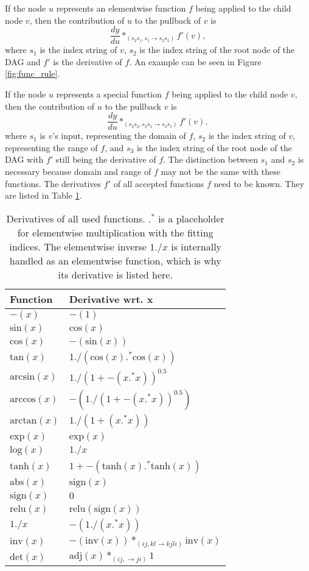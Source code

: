 \documentclass[12pt, a4paper]{report} %
\begin{document}
If the node $u$ represents an elementwise function $f$ being applied to the child node $v$, then the contribution of $u$ to the pullback of $v$ is 
$$
\frac{dy}{du} *_{(s_2s_1,s_1 \rightarrow s_2s_1)} f'(v),
$$
where $s_1$ is the index string of $v$, $s_2$ is the index string of the root node of the DAG and $f'$ is the derivative of $f$.
An example can be seen in Figure \ref{fig:func_rule}.

If the node $u$ represents a special function $f$ being applied to the child node $v$, then the contribution of $u$ to the pullback $v$ is
$$
\frac{dy}{du} *_{(s_3s_2,s_2s_1 \rightarrow s_3s_1)} f'(v),
$$
where $s_1$ is $v$'s input, representing the domain of $f$, $s_2$ is the index string of $v$, representing the range of $f$, and $s_3$ is the index string of the root node of the DAG with $f'$ still being the derivative of $f$.
The distinction between $s_1$ and $s_2$ is necessary because domain and range of $f$ may not be the same with these functions.
The derivatives $f'$ of all accepted functions $f$ need to be known.
They are listed in Table \ref{tab:func_diffs}.

\begin{table}[ht]
    \centering
    \begin{tabular}{l | l}
        Function & Derivative wrt. x \\\hline
        $-(x)$ & $-(1)$ \\
        $\text{sin}(x)$ & $\text{cos}(x)$ \\
        $\text{cos}(x)$ & $-(\text{sin}(x))$ \\
        $\text{tan}(x)$ & $1 ./ (\text{cos}(x) .^* \text{cos}(x))$ \\
        $\text{arcsin}(x)$ & $1 ./ (1 + -(x .^* x))^{0.5}$ \\
        $\text{arccos}(x)$ & $-(1 ./ (1 + -(x .^* x))^{0.5})$ \\
        $\text{arctan}(x)$ & $1 ./ (1 + (x .^* x))$ \\
        $\text{exp}(x)$ & $\text{exp}(x)$ \\
        $\text{log}(x)$ & $1 ./ x$ \\
        $\text{tanh}(x)$ & $1 + -(\text{tanh}(x) .^* \text{tanh}(x))$ \\
        $\text{abs}(x)$ & $\text{sign}(x)$ \\
        $\text{sign}(x)$ & $0$ \\
        $\text{relu}(x)$ & $\text{relu}(\text{sign}(x))$ \\
        $1 ./ x$ & $- (1 ./ (x .^* x))$ \\
        $\text{inv}(x)$ & $-(\text{inv}(x)) *_{(ij,kl \rightarrow kjli)} \text{inv}(x)$ \\
        $\text{det}(x)$ & $\text{adj}(x) *_{(ij, \rightarrow ji)} 1$ \\
    \end{tabular}
    \caption[List of All Function Derivatives Used in Differentiation]{Derivatives of all used functions. $.^*$ is a placeholder for elementwise multiplication with the fitting indices. The elementwise inverse $1 ./ x$ is internally handled as an elementwise function, which is why its derivative is listed here.}
    \label{tab:func_diffs}
\end{table}
\end{document}
